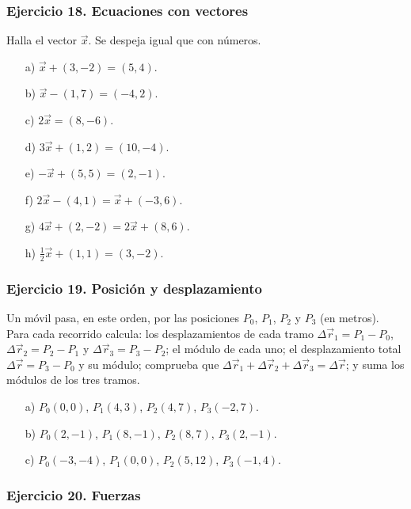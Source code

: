 \subsubsection*{Ejercicio 18. Ecuaciones con vectores}

Halla el vector $\vec{x}$. Se despeja igual que con números.

\begin{enumerate}
    \item[a)] $\vec{x}+(3,-2)=(5,4)$.
    \item[b)] $\vec{x}-(1,7)=(-4,2)$.
    \item[c)] $2\vec{x}=(8,-6)$.
    \item[d)] $3\vec{x}+(1,2)=(10,-4)$.
    \item[e)] $-\vec{x}+(5,5)=(2,-1)$.
    \item[f)] $2\vec{x}-(4,1)=\vec{x}+(-3,6)$.
    \item[g)] $4\vec{x}+(2,-2)=2\vec{x}+(8,6)$.
    \item[h)] $\frac{1}{2}\vec{x}+(1,1)=(3,-2)$.
\end{enumerate}

\subsubsection*{Ejercicio 19. Posición y desplazamiento}

Un móvil pasa, en este orden, por las posiciones $P_0$, $P_1$, $P_2$ y $P_3$ (en metros). Para cada recorrido calcula: los desplazamientos de cada tramo
$\Delta\vec{r}_1=P_1-P_0$,
$\Delta\vec{r}_2=P_2-P_1$ y
$\Delta\vec{r}_3=P_3-P_2$;
el módulo de cada uno; el desplazamiento total
$\Delta\vec{r}=P_3-P_0$ y su módulo; comprueba que
$\Delta\vec{r}_1+\Delta\vec{r}_2+\Delta\vec{r}_3=\Delta\vec{r}$;
y suma los módulos de los tres tramos.

\begin{enumerate}
    \item[a)] $P_0(0,0)$, $P_1(4,3)$, $P_2(4,7)$, $P_3(-2,7)$.
    \item[b)] $P_0(2,-1)$, $P_1(8,-1)$, $P_2(8,7)$, $P_3(2,-1)$.
    \item[c)] $P_0(-3,-4)$, $P_1(0,0)$, $P_2(5,12)$, $P_3(-1,4)$.
\end{enumerate}

\subsubsection*{Ejercicio 20. Fuerzas}

